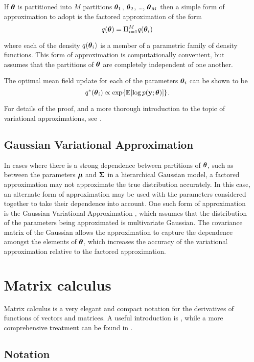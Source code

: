 \documentclass{amsart}[12pt]
\begin{document}
If ${\boldsymbol \theta}$ is partitioned into $M$ partitions ${\boldsymbol \theta}_1$, ${\boldsymbol \theta}_2$, \ldots, ${\boldsymbol \theta}_M$ then a 
simple form of approximation to adopt is the factored approximation of the form
\[
	q({\boldsymbol \theta}) = \Pi_{i=1}^M q({\boldsymbol \theta}_i)
\]

where each of the density $q({\boldsymbol \theta}_i)$ is a member of a parametric family of density functions. This form of
approximation is computationally convenient, but assumes that the partitions of ${\boldsymbol \theta}$ are completely
independent of one another.

The optimal mean field update for each of the parameters ${\boldsymbol \theta}_i$ can be shown to be
\[
	q^*({\boldsymbol \theta}_i) \propto \exp \{ \mathbb{E} [\log p({\bf y}; {\boldsymbol \theta})] \}.
\]

For details of the proof, and a more thorough introduction to the topic of variational approximations, see
\cite{Ormerod2010}.

\subsection{Gaussian Variational Approximation}

In cases where there is a strong dependence between partitions of ${\boldsymbol \theta}$, such as between the parameters
${\boldsymbol \mu}$ and ${\boldsymbol \Sigma}$ in a hierarchical Gaussian model, a factored approximation may not approximate the true
distribution accurately. In this case, an alternate form of approximation may be used with the parameters
considered together to take their dependence into account. One such form of approximation is the Gaussian
Variational Approximation \cite{Ormerod2012}, which assumes that the distribution of the parameters being 
approximated is multivariate Gaussian. The covariance matrix of the Gaussian allows the approximation to
capture the dependence amongst the elements of ${\boldsymbol \theta}$, which increases the accuracy of the variational
approximation relative to the factored approximation.

\section{Matrix calculus}

Matrix calculus is a very elegant and compact notation for the derivatives of functions of vectors and matrices.
A useful introduction is \cite{Wand2002}, while a more comprehensive treatment can be found in
\cite{magnus99}.

\subsection{Notation}
\end{document}
